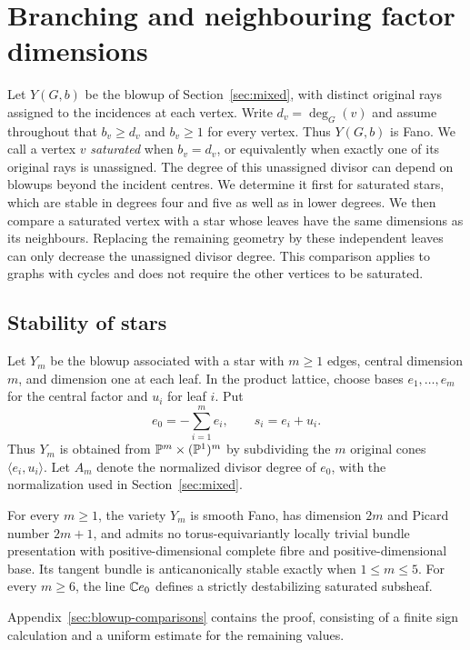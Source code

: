 \section{Branching and neighbouring factor dimensions}\label{sec:mixed-branching}

Let $Y(G,b)$ be the blowup of Section~\ref{sec:mixed}, with distinct
original rays assigned to the incidences at each vertex. Write
$d_v=\deg_G(v)$ and assume throughout that $b_v\ge d_v$ and $b_v\ge1$
for every vertex. Thus $Y(G,b)$ is Fano. We call a vertex $v$
\emph{saturated} when $b_v=d_v$, or equivalently when exactly one of its
original rays is unassigned. The degree of this unassigned divisor
can depend on blowups beyond the incident centres. We determine it first for saturated
stars, which are stable in degrees four and five as well as in lower
degrees. We then compare a saturated vertex with a star whose leaves
have the same dimensions as its neighbours. Replacing the remaining
geometry by these independent leaves can only decrease the unassigned
divisor degree. This comparison applies to graphs with cycles and does
not require the other vertices to be saturated.

\subsection{Stability of stars}

Let $Y_m$ be the blowup associated with a star with $m\ge1$ edges,
central dimension $m$, and dimension one at each leaf. In the product
lattice, choose bases $e_1,\ldots,e_m$ for the central factor and $u_i$
for leaf $i$. Put
\[
 e_0=-\sum_{i=1}^m e_i,\qquad s_i=e_i+u_i.
\]
Thus $Y_m$ is obtained from $\mathbb{P}^m\times(\mathbb{P}^1)^m$ by subdividing the
$m$ original cones $\langle e_i,u_i\rangle$. Let $A_m$ denote the
normalized divisor degree of $e_0$, with the normalization used in
Section~\ref{sec:mixed}.

\begin{theorem}\label{branch:stars}
For every $m\ge1$, the variety $Y_m$ is smooth Fano, has dimension $2m$
and Picard number $2m+1$, and admits no torus-equivariantly locally
trivial bundle presentation with positive-dimensional complete fibre
and positive-dimensional base. Its tangent bundle is anticanonically
stable exactly when $1\le m\le5$. For every $m\ge6$, the line
$\mathbb{C} e_0$ defines a strictly destabilizing saturated subsheaf.
\end{theorem}

Appendix~\ref{sec:blowup-comparisons} contains the proof, consisting of
a finite sign calculation and a uniform estimate for the remaining
values.


